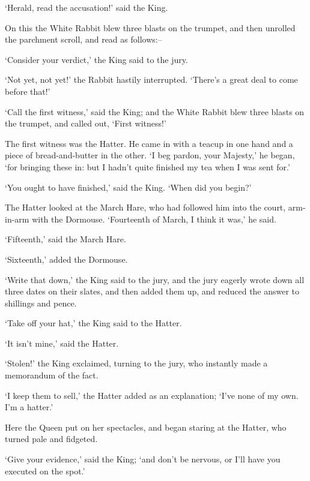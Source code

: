   `Herald, read the accusation!' said the King.

  On this the White Rabbit blew three blasts on the trumpet, and
then unrolled the parchment scroll, and read as follows:--

\onelineskip
{}
\onelineskip

  `Consider your verdict,' the King said to the jury.

  `Not yet, not yet!' the Rabbit hastily interrupted.  `There's
a great deal to come before that!'

  `Call the first witness,' said the King; and the White Rabbit
blew three blasts on the trumpet, and called out, `First
witness!'

  The first witness was the Hatter.  He came in with a teacup in
one hand and a piece of bread-and-butter in the other.  `I beg
pardon, your Majesty,' he began, `for bringing these in:  but I
hadn't quite finished my tea when I was sent for.'

  `You ought to have finished,' said the King.  `When did you
begin?'

  The Hatter looked at the March Hare, who had followed him into
the court, arm-in-arm with the Dormouse.  `Fourteenth of March, I
think it was,' he said.

  `Fifteenth,' said the March Hare.

  `Sixteenth,' added the Dormouse.

  `Write that down,' the King said to the jury, and the jury
eagerly wrote down all three dates on their slates, and then
added them up, and reduced the answer to shillings and pence.

  `Take off your hat,' the King said to the Hatter.

  `It isn't mine,' said the Hatter.

  `Stolen!' the King exclaimed, turning to the jury, who
instantly made a memorandum of the fact.

  `I keep them to sell,' the Hatter added as an explanation;
`I've none of my own.  I'm a hatter.'

  Here the Queen put on her spectacles, and began staring at the
Hatter, who turned pale and fidgeted.

  `Give your evidence,' said the King; `and don't be nervous, or
I'll have you executed on the spot.'

